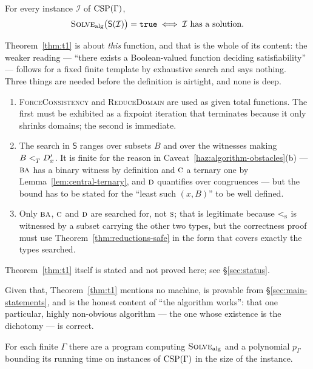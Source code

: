 \begin{theorem}\label{thm:t1}
For every instance $\mathcal I$ of $\operatorname{CSP}(\Gamma)$,
\[
  \textsc{Solve}_{\mathrm{alg}}\bigl(\mathsf S(\mathcal I)\bigr)=\texttt{true}
  \iff \mathcal I\ \text{has a solution}.
\]
\end{theorem}

\begin{hazard}\label{haz:t1-names-solve}
Theorem~\ref{thm:t1} is about \emph{this} function, and that is the whole of
its content: the weaker reading --- ``there exists a Boolean-valued function
deciding satisfiability'' --- follows for a fixed finite template by exhaustive
search and says nothing. Three things are needed before the definition is
airtight, and none is deep.

\begin{enumerate}\alphlabels\tightlist
\item \textsc{ForceConsistency} and \textsc{ReduceDomain} are used as given
  total functions. The first must be exhibited as a fixpoint iteration that
  terminates because it only shrinks domains; the second is immediate.
\item The search in $\mathsf S$ ranges over subsets $B$ and over the witnesses
  making $B<_{T}^{}D'_{x}$. It is finite for the reason in
  Caveat~\ref{haz:algorithm-obstacles}(b) --- $\textup{\textsc{ba}}$ has a binary witness by
  definition and $\textup{\textsc{c}}$ a ternary one by Lemma~\ref{lem:central-ternary}, and
  $\textup{\textsc{d}}$ quantifies over congruences --- but the bound has to be stated for the
  ``least such $(x,B)$'' to be well defined.
\item Only $\textup{\textsc{ba}}$, $\textup{\textsc{c}}$ and $\textup{\textsc{d}}$ are searched for, not $\textup{\textsc{s}}$; that is
  legitimate because $<_{\textup{\textsc{s}}}^{}$ is witnessed by a subset carrying the other
  two types, but the correctness proof must use
  Theorem~\ref{thm:reductions-safe} in the form that covers exactly the types
  searched.
\end{enumerate}

Theorem~\ref{thm:t1} itself is stated and not proved here; see
\S\ref{sec:status}.
\end{hazard}

Given that, Theorem~\ref{thm:t1} mentions no machine, is provable from
\S\ref{sec:main-statements}, and is the honest content of ``the algorithm
works'': that one particular, highly non-obvious algorithm --- the one whose
existence is the dichotomy --- is correct.

\begin{theorem}\label{thm:t2}
For each finite $\Gamma$ there are a program computing
$\textsc{Solve}_{\mathrm{alg}}$ and a
polynomial $p_{\Gamma}$ bounding its running time on instances of
$\operatorname{CSP}(\Gamma)$ in the size of the instance.
\end{theorem}

